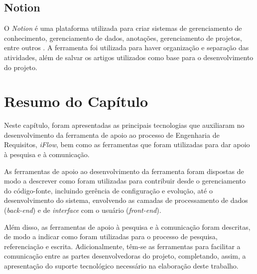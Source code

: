 \subsection{Notion}
O \textit{Notion} é uma plataforma utilizada para criar sistemas de gerenciamento de conhecimento, gerenciamento de dados, anotações, gerenciamento de projetos, entre outros \cite{notion}. A ferramenta foi utilizada para haver organização e separação das atividades, além de salvar os artigos utilizados como base para o desenvolvimento do projeto.

\section{Resumo do Capítulo}

\label{sec_tec_resumo}

Neste capítulo, foram apresentadas as principais tecnologias que auxiliaram no desenvolvimento da ferramenta de apoio ao processo de Engenharia de Requisitos, \textit{iFlow}, bem como as ferramentas que foram utilizadas para dar apoio à pesquisa e à comunicação.

As ferramentas de apoio ao desenvolvimento da ferramenta foram dispostas de modo a descrever como foram utilizadas para contribuir desde o gerenciamento do código-fonte, incluindo gerência de configuração e evolução, até o desenvolvimento do sistema, envolvendo as camadas de processamento de dados (\textit{back-end}) e de \textit{interface} com o usuário (\textit{front-end}).

Além disso, as ferramentas de apoio à pesquisa e à comunicação foram descritas, de modo a indicar como foram utilizadas para o processo de pesquisa, referenciação e escrita. Adicionalmente, têm-se as ferramentas para facilitar a comunicação entre as partes desenvolvedoras do projeto, completando, assim, a apresentação do suporte tecnológico necessário na elaboração deste trabalho.